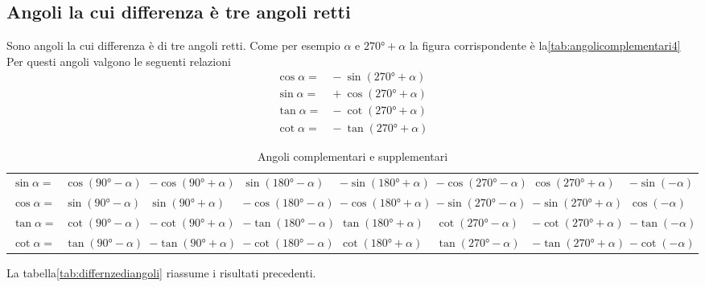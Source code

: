 \subsection{Angoli la cui differenza è tre angoli retti}
Sono angoli la cui differenza è di tre angoli retti. Come per esempio $\alpha$ e $\ang{270}+\alpha$ la figura corrispondente è la\nobs\vref{tab:angolicomplementari4}
%		
Per questi angoli valgono le seguenti relazioni
\begin{align*}
\cos\alpha=&{}-\sin(\ang{270}+\alpha)\\
\sin\alpha=&{}+\cos(\ang{270}+\alpha)\\
\tan\alpha=&{}-\cot(\ang{270}+\alpha)\\
\cot\alpha=&{}-\tan(\ang{270}+\alpha)
\end{align*}
\begin{table}
\centering
	\footnotesize
	\begin{tabular}{rlllllll}
	\toprule
	$\sin\alpha=$&$\cos(\ang{90}-\alpha)$&$-\cos(\ang{90}+\alpha)$&$\sin(\ang{180}-\alpha)$&$-\sin(\ang{180}+\alpha)$&$-\cos(\ang{270}-\alpha)$&$\cos(\ang{270}+\alpha)$&$-\sin(-\alpha)$\\[.6cm] 
	$\cos\alpha=$&$\sin(\ang{90}-\alpha)$&$\sin(\ang{90}+\alpha)$&$-\cos(\ang{180}-\alpha)$&$-\cos(\ang{180}+\alpha)$&$-\sin(\ang{270}-\alpha)$&$-\sin(\ang{270}+\alpha)$&$\cos(-\alpha)$\\[.6cm] 
	$\tan\alpha=$&$\cot(\ang{90}-\alpha)$&$-\cot(\ang{90}+\alpha)$&$-\tan(\ang{180}-\alpha)$&$\tan(\ang{180}+\alpha)$&$\cot(\ang{270}-\alpha)$&$-\cot(\ang{270}+\alpha)$&$-\tan(-\alpha)$\\[.6cm] 
	$\cot\alpha=$&$\tan(\ang{90}-\alpha)$&$-\tan(\ang{90}+\alpha)$&$-\cot(\ang{180}-\alpha)$&$\cot(\ang{180}+\alpha)$&$\tan(\ang{270}-\alpha)$&$-\tan(\ang{270}+\alpha)$&$-\cot(-\alpha)$\\[.6cm]
	\bottomrule
	\end{tabular}
	\caption{Angoli complementari e supplementari}\label{tab:differnzediangoli}
\end{table}
La tabella\nobs\vref{tab:differnzediangoli} riassume i risultati precedenti.
